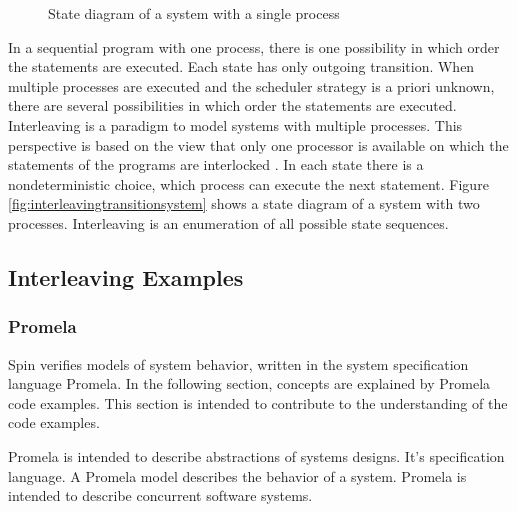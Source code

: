 \documentclass[12pt,a4paper,twoside]{article}
\begin{document}
\begin{figure}
 \centering

  \caption{State diagram of a system with a single process}
  \label{fig:sequencielstatediagram}
\end{figure}

In a sequential program with one process, there is one possibility in which order the statements are executed. Each state has only outgoing transition. When multiple processes are executed and the scheduler strategy is a priori unknown, there are several possibilities in which order the statements are executed. Interleaving is a paradigm to model systems with multiple processes. This perspective is based on the view that only one processor is available on which the statements of the programs are interlocked \cite{baier08}. In each state there is a nondeterministic choice, which process can execute the next statement. Figure \ref{fig:interleavingtransitionsystem} shows a state diagram of a system with two processes. Interleaving is an enumeration of all possible state sequences.

\subsection{Interleaving Examples}
\label{sec:interleavingexamples}

\subsubsection{Promela}
\label{sec:promela}

Spin verifies models of system behavior, written in the system specification language Promela. In the following section, concepts are explained by Promela code examples. This section is intended to contribute to the understanding of the code examples.

Promela is intended to describe abstractions of systems designs. It's specification language. A Promela model describes the behavior of a system. Promela is intended to describe concurrent software systems.
\end{document}
